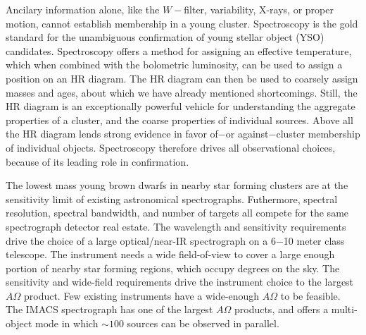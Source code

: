 Ancilary information alone, like the $W-$filter, variability, X-rays, or proper motion, cannot establish membership in a young cluster.  Spectroscopy is the gold standard for the unambiguous confirmation of young stellar object (YSO) candidates.  Spectroscopy offers a method for assigning an effective temperature, which when combined with the bolometric luminosity, can be used to assign a position on an HR diagram.  The HR diagram can then be used to coarsely assign masses and ages, about which we have already mentioned shortcomings.  Still, the HR diagram is an exceptionally powerful vehicle for understanding the aggregate properties of a cluster, and the coarse properties of individual sources.  Above all the HR diagram lends strong evidence in favor of$-$or against$-$cluster membership of individual objects.  Spectroscopy therefore drives all observational choices, because of its leading role in confirmation.

The lowest mass young brown dwarfs in nearby star forming clusters are at the sensitivity limit of existing astronomical spectrographs.  Futhermore, spectral resolution, spectral bandwidth, and number of targets all compete for the same spectrograph detector real estate.  The wavelength and sensitivity requirements drive the choice of a large optical/near-IR spectrograph on a 6$-$10 meter class telescope.  The instrument needs a wide field-of-view to cover a large enough portion of nearby star forming regions, which occupy degrees on the sky.  The sensitivity and wide-field requirements drive the instrument choice to the largest $A\Omega$ product.  Few existing instruments have a wide-enough $A\Omega$ to be feasible.  The IMACS spectrograph has one of the largest $A\Omega$ products, and offers a multi-object mode in which $\sim100$ sources can be observed in parallel.  

